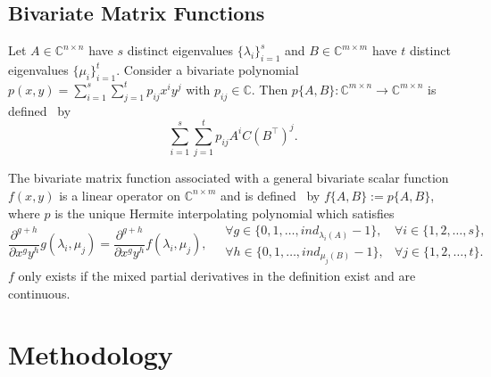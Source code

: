 \subsection{Bivariate Matrix Functions}
Let $A \in \mathbb{C}^{n \times n}$ have $s$ distinct eigenvalues $\{\lambda_i\}_{i=1}^{s}$
and $B \in \mathbb{C}^{m \times m}$ have $t$ distinct eigenvalues $\{\mu_i\}_{i=1}^{t}$.
Consider a bivariate polynomial $p(x, y) = \sum_{i=1}^{s} \sum_{j=1}^{t} p_{ij} x^i y^j$
with $p_{ij} \in \mathbb{C}$. Then $p\{A, B\}: \mathbb{C}^{m \times n} \to \mathbb{C}^{m \times n}$
is defined~\cite{kressner2014bivariate} by
\begin{equation}
    \sum_{i=1}^{s} \sum_{j=1}^{t} p_{ij} A^i C (B^\top)^j.
\end{equation}

The bivariate matrix function associated with a general bivariate scalar function
$f(x, y)$ is a linear operator on $\mathbb{C}^{n \times m}$ and is
defined~\cite{kressner2014bivariate} by $f\{A, B\} := p\{A, B\}$, where $p$ is the
unique Hermite interpolating polynomial which satisfies
\begin{equation*}
    \frac{\partial^{g+h}}{\partial x^g y^h}g(\lambda_i, \mu_j)
    = \frac{\partial^{g+h}}{\partial x^g y^h}f(\lambda_i, \mu_j),
    \quad
    \begin{matrix}
        \forall g \in \{0, 1, \dots, ind_{\lambda_i(A)}-1\},
        & \forall i \in \{1, 2, \dots, s\},
        \\
        \forall h \in \{0, 1, \dots, ind_{\mu_j(B)}-1\},
        & \forall j \in \{1, 2, \dots, t\}.
    \end{matrix}
\end{equation*}
$f$ only exists if the mixed partial derivatives in the definition exist and
are continuous.

\newpage
\section{Methodology}\label{sec:methods}

